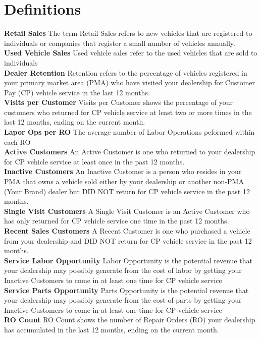 \documentclass[11pt,a4paper,oneside]{article}
\begin{document}
\section{Definitions}
\textbf{Retail Sales} The term Retail Sales refers to new vehicles that are registered to individuals or companies that register a small number of vehicles annually.\\
\textbf{Used Vehicle Sales} Used vehicle sales refer to the used vehicles that are sold to individuals\\
\textbf{Dealer Retention} Retention refers to the percentage of vehicles registered in your primary market area (PMA) who have visited your dealership for Customer Pay (CP) vehicle service in the last 12 months.\\
\textbf{Visits per Customer} Visits per Customer shows the percentage of your customers who returned for CP vehicle service at least two or more times in the last 12 months, ending on the current month.\\
\textbf{Lapor Ops per RO} The average number of Labor Operations peformed within each RO\\
\textbf{Active Customers} An Active Customer is one who returned to your dealership for CP vehicle service at least once in the past 12 months.\\
\textbf{Inactive Customers} An Inactive Customer is a person who resides in your PMA that owns a vehicle sold either by your dealership or another non-PMA (Your Brand) dealer but DID NOT return for CP vehicle service in the past 12 months.\\
\textbf{Single Visit Customers} A Single Visit Customer is an Active Customer who has only returned for CP vehicle service one time in the past 12 months.\\
\textbf{Recent Sales Customers} A Recent Customer is one who purchased a vehicle from your dealership and DID NOT return for CP vehicle service in the past 12 months.\\
\textbf{Service Labor Opportunity} Labor Opportunity is the potential revenue that your dealership may possibly generate from the cost of labor by getting your Inactive Customers to come in at least one time for CP vehicle service\\
\textbf{Service Parts Opportunity} Parts Opportunity is the potential revenue that your dealership may possibly generate from the cost of parts by getting your Inactive Customers to come in at least one time for CP vehicle service\\
\textbf{RO Count} RO Count shows the number of Repair Orders (RO) your dealership has accumulated in the last 12 months, ending on the current month.\\
\end{document}

